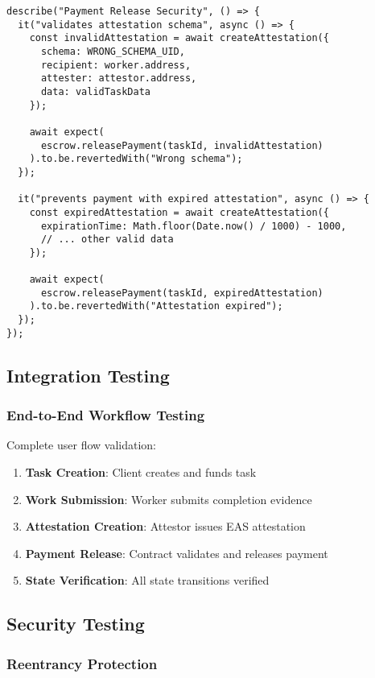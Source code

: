 \documentclass[12pt,a4paper]{article}
\begin{document}
\begin{lstlisting}[style=typescript]
describe("Payment Release Security", () => {
  it("validates attestation schema", async () => {
    const invalidAttestation = await createAttestation({
      schema: WRONG_SCHEMA_UID,
      recipient: worker.address,
      attester: attestor.address,
      data: validTaskData
    });
    
    await expect(
      escrow.releasePayment(taskId, invalidAttestation)
    ).to.be.revertedWith("Wrong schema");
  });
  
  it("prevents payment with expired attestation", async () => {
    const expiredAttestation = await createAttestation({
      expirationTime: Math.floor(Date.now() / 1000) - 1000,
      // ... other valid data
    });
    
    await expect(
      escrow.releasePayment(taskId, expiredAttestation)
    ).to.be.revertedWith("Attestation expired");
  });
});
\end{lstlisting}

\subsection{Integration Testing}

\subsubsection{End-to-End Workflow Testing}

Complete user flow validation:
\begin{enumerate}
    \item \textbf{Task Creation}: Client creates and funds task
    \item \textbf{Work Submission}: Worker submits completion evidence
    \item \textbf{Attestation Creation}: Attestor issues EAS attestation
    \item \textbf{Payment Release}: Contract validates and releases payment
    \item \textbf{State Verification}: All state transitions verified
\end{enumerate}

\subsection{Security Testing}

\subsubsection{Reentrancy Protection}
\end{document}
